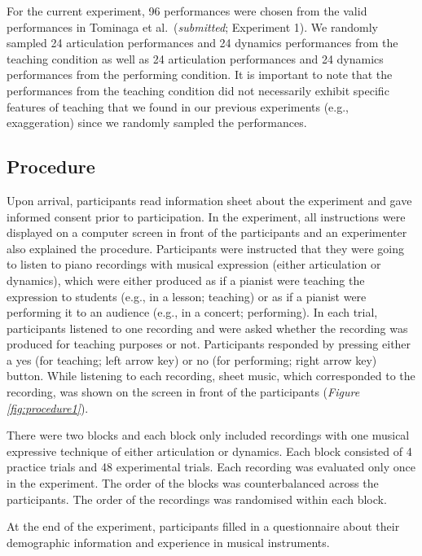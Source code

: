\documentclass[
  man,floatsintext]{apa6}
\begin{document}
For the current experiment, 96 performances were chosen from the valid performances in Tominaga et al.~(\emph{submitted}; Experiment 1). We randomly sampled 24 articulation performances and 24 dynamics performances from the teaching condition as well as 24 articulation performances and 24 dynamics performances from the performing condition. It is important to note that the performances from the teaching condition did not necessarily exhibit specific features of teaching that we found in our previous experiments (e.g., exaggeration) since we randomly sampled the performances.

\hypertarget{procedure}{%
\subsection{Procedure}\label{procedure}}

Upon arrival, participants read information sheet about the experiment and gave informed consent prior to participation. In the experiment, all instructions were displayed on a computer screen in front of the participants and an experimenter also explained the procedure. Participants were instructed that they were going to listen to piano recordings with musical expression (either articulation or dynamics), which were either produced as if a pianist were teaching the expression to students (e.g., in a lesson; teaching) or as if a pianist were performing it to an audience (e.g., in a concert; performing). In each trial, participants listened to one recording and were asked whether the recording was produced for teaching purposes or not. Participants responded by pressing either a yes (for teaching; left arrow key) or no (for performing; right arrow key) button. While listening to each recording, sheet music, which corresponded to the recording, was shown on the screen in front of the participants (\emph{Figure \ref{fig:procedure1}}).

There were two blocks and each block only included recordings with one musical expressive technique of either articulation or dynamics. Each block consisted of 4 practice trials and 48 experimental trials. Each recording was evaluated only once in the experiment. The order of the blocks was counterbalanced across the participants. The order of the recordings was randomised within each block.

At the end of the experiment, participants filled in a questionnaire about their demographic information and experience in musical instruments.
\end{document}
